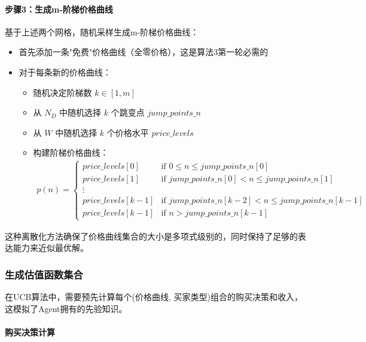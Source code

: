 \paragraph{步骤3：生成m-阶梯价格曲线}

基于上述两个网格，随机采样生成m-阶梯价格曲线：

\begin{itemize}
    \item 首先添加一条"免费"价格曲线（全零价格），这是算法3第一轮必需的
    \item 对于每条新的价格曲线：
    \begin{itemize}
        \item 随机决定阶梯数 $k \in [1, m]$
        \item 从 $N_D$ 中随机选择 $k$ 个跳变点 $jump\_points\_n$
        \item 从 $W$ 中随机选择 $k$ 个价格水平 $price\_levels$
        \item 构建阶梯价格曲线：
        \begin{align*}
            p(n) = \begin{cases}
                price\_levels[0] & \text{if } 0 \leq n \leq jump\_points\_n[0] \\
                price\_levels[1] & \text{if } jump\_points\_n[0] < n \leq jump\_points\_n[1] \\
                \vdots \\
                price\_levels[k-1] & \text{if } jump\_points\_n[k-2] < n \leq jump\_points\_n[k-1] \\
                price\_levels[k-1] & \text{if } n > jump\_points\_n[k-1]
            \end{cases}
        \end{align*}
    \end{itemize}
\end{itemize}

这种离散化方法确保了价格曲线集合的大小是多项式级别的，同时保持了足够的表达能力来近似最优解。




\subsubsection{生成估值函数集合}

在UCB算法中，需要预先计算每个(价格曲线, 买家类型)组合的购买决策和收入，这模拟了Agent拥有的先验知识。

\paragraph{购买决策计算}

